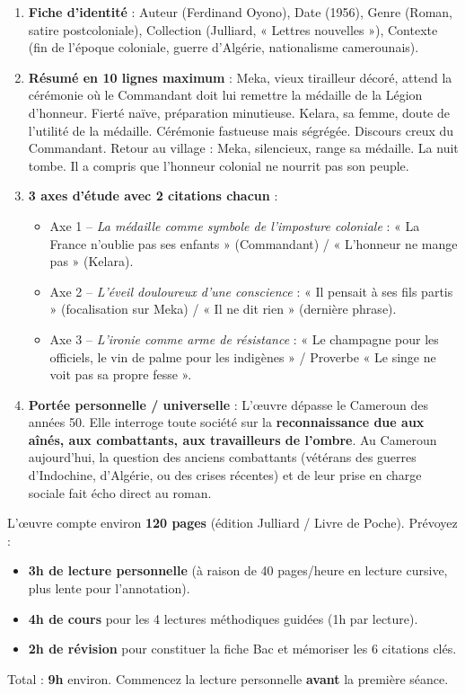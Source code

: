 \documentclass[11pt]{article}
\begin{document}
\begin{methode}
\begin{enumerate}
\item \textbf{Fiche d'identité} : Auteur (Ferdinand Oyono), Date (1956), Genre (Roman, satire postcoloniale), Collection (Julliard, « Lettres nouvelles »), Contexte (fin de l'époque coloniale, guerre d'Algérie, nationalisme camerounais).
\item \textbf{Résumé en 10 lignes maximum} : Meka, vieux tirailleur décoré, attend la cérémonie où le Commandant doit lui remettre la médaille de la Légion d'honneur. Fierté naïve, préparation minutieuse. Kelara, sa femme, doute de l'utilité de la médaille. Cérémonie fastueuse mais ségrégée. Discours creux du Commandant. Retour au village : Meka, silencieux, range sa médaille. La nuit tombe. Il a compris que l'honneur colonial ne nourrit pas son peuple.
\item \textbf{3 axes d'étude avec 2 citations chacun} :
\begin{itemize}
\item Axe 1 -- \emph{La médaille comme symbole de l'imposture coloniale} : « La France n'oublie pas ses enfants » (Commandant) / « L'honneur ne mange pas » (Kelara).
\item Axe 2 -- \emph{L'éveil douloureux d'une conscience} : « Il pensait à ses fils partis » (focalisation sur Meka) / « Il ne dit rien » (dernière phrase).
\item Axe 3 -- \emph{L'ironie comme arme de résistance} : « Le champagne pour les officiels, le vin de palme pour les indigènes » / Proverbe « Le singe ne voit pas sa propre fesse ».
\end{itemize}
\item \textbf{Portée personnelle / universelle} : L'œuvre dépasse le Cameroun des années 50. Elle interroge toute société sur la \textbf{reconnaissance due aux aînés, aux combattants, aux travailleurs de l'ombre}. Au Cameroun aujourd'hui, la question des anciens combattants (vétérans des guerres d'Indochine, d'Algérie, ou des crises récentes) et de leur prise en charge sociale fait écho direct au roman.
\end{enumerate}
\end{methode}

\begin{exemplebox}
L'œuvre compte environ \textbf{120 pages} (édition Julliard / Livre de Poche). Prévoyez :
\begin{itemize}
\item \textbf{3h de lecture personnelle} (à raison de 40 pages/heure en lecture cursive, plus lente pour l'annotation).
\item \textbf{4h de cours} pour les 4 lectures méthodiques guidées (1h par lecture).
\item \textbf{2h de révision} pour constituer la fiche Bac et mémoriser les 6 citations clés.
\end{itemize}
Total : \textbf{9h} environ. Commencez la lecture personnelle \textbf{avant} la première séance.
\end{exemplebox}
\end{document}
